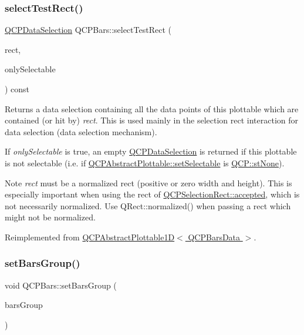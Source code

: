 \subsubsection{\texorpdfstring{select\+Test\+Rect()}{selectTestRect()}}
{\footnotesize\ttfamily \hyperlink{class_q_c_p_data_selection}{Q\+C\+P\+Data\+Selection} Q\+C\+P\+Bars\+::select\+Test\+Rect (\begin{DoxyParamCaption}\item[{const Q\+RectF \&}]{rect,  }\item[{bool}]{only\+Selectable }\end{DoxyParamCaption}) const\hspace{0.3cm}{\ttfamily [virtual]}}





Returns a data selection containing all the data points of this plottable which are contained (or hit by) {\itshape rect}. This is used mainly in the selection rect interaction for data selection (data selection mechanism).

If {\itshape only\+Selectable} is true, an empty \hyperlink{class_q_c_p_data_selection}{Q\+C\+P\+Data\+Selection} is returned if this plottable is not selectable (i.\+e. if \hyperlink{class_q_c_p_abstract_plottable_ac238d6e910f976f1f30d41c2bca44ac3}{Q\+C\+P\+Abstract\+Plottable\+::set\+Selectable} is \hyperlink{namespace_q_c_p_ac6cb9db26a564b27feda362a438db038aa64628e338a2dd1e6f0dc84dec0b63fe}{Q\+C\+P\+::st\+None}).

\begin{DoxyNote}{Note}
{\itshape rect} must be a normalized rect (positive or zero width and height). This is especially important when using the rect of \hyperlink{class_q_c_p_selection_rect_a15a43542e1f7b953a44c260b419e6d2c}{Q\+C\+P\+Selection\+Rect\+::accepted}, which is not necessarily normalized. Use {\ttfamily Q\+Rect\+::normalized()} when passing a rect which might not be normalized. 
\end{DoxyNote}


Reimplemented from \hyperlink{class_q_c_p_abstract_plottable1_d_a22377bf6e57ab7eedbc9e489250c6ded}{Q\+C\+P\+Abstract\+Plottable1\+D$<$ Q\+C\+P\+Bars\+Data $>$}.

\mbox{\label{class_q_c_p_bars_aedd1709061f0b307c47ddb45e172ef9a}} 
\subsubsection{\texorpdfstring{set\+Bars\+Group()}{setBarsGroup()}}
{\footnotesize\ttfamily void Q\+C\+P\+Bars\+::set\+Bars\+Group (\begin{DoxyParamCaption}\item[{\hyperlink{class_q_c_p_bars_group}{Q\+C\+P\+Bars\+Group} $\ast$}]{bars\+Group }\end{DoxyParamCaption})}

